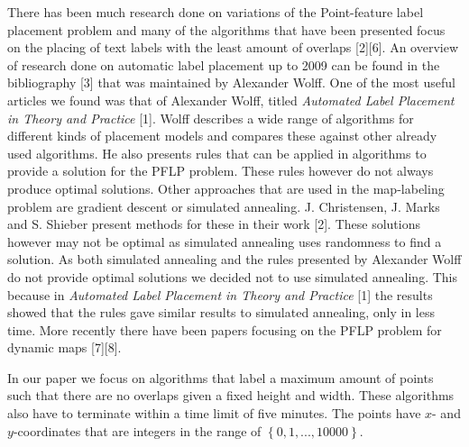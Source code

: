 \documentclass[crop=false,a4paper,oneside,11pt]{standalone}
\begin{document}
 There has been much research done on variations of the Point-feature label placement problem and many of the algorithms that have been presented focus on the placing of text labels with the least amount of overlaps [2][6]. An overview of research done on automatic label placement up to 2009 can be found in the bibliography [3] that was maintained by Alexander Wolff. One of the most useful articles we found was that of Alexander Wolff, titled \emph{Automated Label Placement in Theory and Practice} [1]. Wolff describes a wide range of algorithms for different kinds of placement models and compares these against other already used algorithms. He also presents rules that can be applied in algorithms to provide a solution for the PFLP problem. These rules however do not always produce optimal solutions. Other approaches that are used in the map-labeling problem are gradient descent or simulated annealing. J. Christensen, J. Marks and S. Shieber present methods for these in their work [2]. These solutions however may not be optimal as simulated annealing uses randomness to find a solution. As both simulated annealing and the rules presented by Alexander Wolff do not provide optimal solutions we decided not to use simulated annealing. This because in \emph{Automated Label Placement in Theory and Practice} [1] the results showed that the rules gave similar results to simulated annealing, only in less time.  More recently there have been papers focusing on the PFLP problem for dynamic maps [7][8].

 In our paper we focus on algorithms that label a maximum amount of points such that there are no overlaps given a fixed height and width. These algorithms also have to terminate within a time limit of five minutes. The points have $x$- and $y$-coordinates that are integers in the range of $\left\{0,1,...,10000\right\}$.
\end{document}
